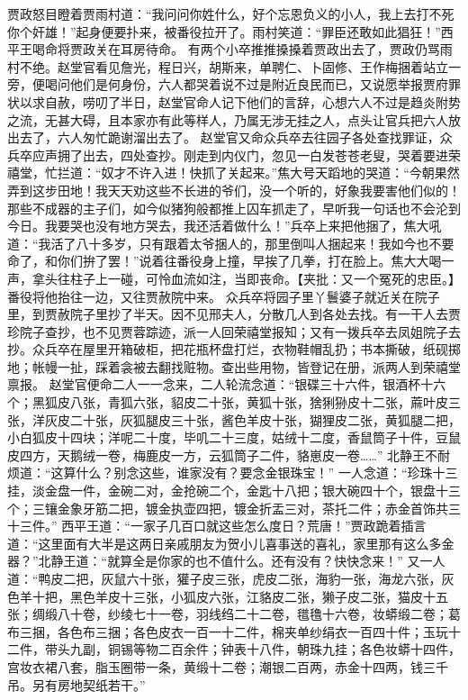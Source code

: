 \documentclass[12pt,oneside]{book}
\begin{document}
贾政怒目瞪着贾雨村道：“我问问你姓什么，好个忘恩负义的小人，我上去打不死你个奸雄！”起身便要扑来，被番役拉开了。雨村笑道：“罪臣还敢如此猖狂！”西平王喝命将贾政关在耳房待命。
有两个小卒推推搡搡着贾政出去了，贾政仍骂雨村不绝。赵堂官看见詹光，程日兴，胡斯来，单聘仁、卜固修、王作梅捆着站立一旁，便喝问他们是何身份，六人都哭着说不过是附近良民而已，又说愿举报贾府罪状以求自赦，唠叨了半日，赵堂官命人记下他们的言辞，心想六人不过是趋炎附势之流，无甚大碍，且本家亦有此等样人，乃属无涉无挂之人，点头让官兵把六人放出去了，六人匆忙跪谢溜出去了。
赵堂官又命众兵卒去往园子各处查找罪证，众兵卒应声拥了出去，四处查抄。刚走到内仪门，忽见一白发苍苍老叟，哭着要进荣禧堂，忙拦道：“奴才不许入进！快抓了关起来。”焦大号天蹈地的哭道：“今朝果然弄到这步田地！我天天劝这些不长进的爷们，没一个听的，好象我要害他们似的！那些不成器的主子们，如今似猪狗般都推上囚车抓走了，早听我一句话也不会沦到今日。我要哭也没有地方哭去，我还活着做什么！”兵卒上来把他捆了，焦大吼道：“我活了八十多岁，只有跟着太爷捆人的，那里倒叫人捆起来！我如今也不要命了，和你们拚了罢！”说着往番役身上撞，早挨了几拳，打在脸上。焦大大喝一声，拿头往柱子上一碰，可怜血流如注，当即丧命。【夹批：又一个冤死的忠臣。】番役将他抬往一边，又往贾赦院中来。
众兵卒将园子里丫鬟婆子就近关在院子里，到贾赦院子里抄了半天。因不见邢夫人，分散几人到各处去找。有一干人去贾珍院子查抄，也不见贾蓉踪迹，派一人回荣禧堂报知；又有一拨兵卒去凤姐院子去抄。众兵卒在屋里开箱破柜，把花瓶杯盘打烂，衣物鞋帽乱扔；书本撕破，纸砚掷地；帐幔一扯，踩着衾被去翻找赃物。查出些用物，皆登记在册，派两人到荣禧堂禀报。
赵堂官便命二人一一念来，二人轮流念道：“银碟三十六件，银酒杯十六个；黑狐皮八张，青狐六张，貂皮二十张，黄狐十张，猞猁狲皮十二张，蔴叶皮三张，洋灰皮二十张，灰狐腿皮三十张，酱色羊皮十张，猢狸皮二张，黄狐腿二把，小白狐皮十四块；洋呢二十度，毕叽二十三度，姑绒十二度，香鼠筒子十件，豆鼠皮四方，天鹅绒一卷，梅鹿皮一方，云狐筒子二件，貉崽皮一卷……”
北静王不耐烦道：“这算什么？别念这些，谁家没有？要念金银珠宝！”
一人念道：“珍珠十三挂，淡金盘一件，金碗二对，金抢碗二个，金匙十八把；银大碗四十个，银盘十三个；三镶金象牙筋二把，镀金执壶四把，镀金折盂三对，茶托二件；赤金首饰共三十三件。”
西平王道：“一家子几百口就这些怎么度日？荒唐！”贾政跪着插言道：“这里面有大半是这两日亲戚朋友为贺小儿喜事送的喜礼，家里那有这么多金器？”北静王道：“就算全是你家的也不值什么。还有没有？快快念来！”
又一人道：“鸭皮二把，灰鼠六十张，獾子皮三张，虎皮二张，海豹一张，海龙六张，灰色羊十把，黑色羊皮十三张，小狐皮六张，江貉皮二张，獭子皮二张，猫皮十五张；绸缎八十卷，纱绫七十一卷，羽线绉二十二卷，氆氇十六卷，妆蟒缎二卷；葛布三捆，各色布三捆；各色皮衣一百一十二件，棉夹单纱绢衣一百四十件；玉玩十二件，带头九副，铜锡等物二百余件；钟表十八件，朝珠九挂；各色妆蟒十四件，宫妆衣裙八套，脂玉圈带一条，黄缎十二卷；潮银二百两，赤金十四两，钱三千吊。另有房地契纸若干。”
\end{document}
